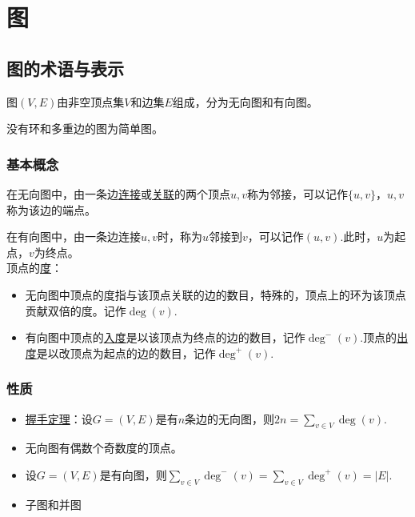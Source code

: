 \section{图}
\subsection{图的术语与表示}
图$(V, E)$由非空顶点集$V$和边集$E$组成，分为无向图和有向图。

没有环和多重边的图为简单图。

\subsubsection*{基本概念}
在无向图中，由一条边\uline{连接}或\uline{关联}的两个顶点$u,v$称为邻接，可以记作$\{u, v\}$，$u,v$称为该边的端点。

在有向图中，由一条边连接$u,v$时，称为$u$邻接到$v$，可以记作$(u,v)$.此时，$u$为起点，$v$为终点。\\

顶点的\uline{度}：
\begin{itemize}
    \item 无向图中顶点的度指与该顶点关联的边的数目，特殊的，顶点上的环为该顶点贡献双倍的度。记作$\deg (v)$.
    \item 有向图中顶点的\uline{入度}是以该顶点为终点的边的数目，记作$\deg ^- (v)$.顶点的\uline{出度}是以改顶点为起点的边的数目，记作$\deg ^+ (v)$.
\end{itemize}

\subsubsection*{性质}
\begin{itemize}
    \item \uline{握手定理}：设$G = (V,E)$是有$n$条边的无向图，则$2n = \displaystyle \sum _{v \in V} \deg (v)$.

    \item 无向图有偶数个奇数度的顶点。

    \item 设$G = (V,E)$是有向图，则$\displaystyle \sum _{v \in V} \deg ^- (v) = \sum _{v \in V} \deg ^+ (v) = \lvert E \rvert$.
    \item 子图和并图
    
\end{itemize}

